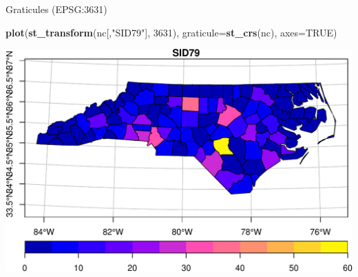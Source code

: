 \documentclass[11pt,ignorenonframetext,]{beamer}
\newenvironment{Shaded}{}{}
\newcommand{\DataTypeTok}[1]{\textcolor[rgb]{0.56,0.13,0.00}{#1}}
\newcommand{\DecValTok}[1]{\textcolor[rgb]{0.25,0.63,0.44}{#1}}
\newcommand{\KeywordTok}[1]{\textcolor[rgb]{0.00,0.44,0.13}{\textbf{#1}}}
\newcommand{\NormalTok}[1]{#1}
\newcommand{\OtherTok}[1]{\textcolor[rgb]{0.00,0.44,0.13}{#1}}
\newcommand{\StringTok}[1]{\textcolor[rgb]{0.25,0.44,0.63}{#1}}
\let\oldShaded\Shaded
\let\endoldShaded\endShaded
\renewenvironment{Shaded}{\footnotesize\begin{spacing}{0.9}\oldShaded}{\endoldShaded\end{spacing}}
\let\oldverbatim\verbatim
\let\endoldverbatim\endverbatim
\newcommand{\scriptoutput}{
  \renewenvironment{Shaded}{\scriptsize\begin{spacing}{0.9}\oldShaded}{\endoldShaded\end{spacing}}
  \renewenvironment{verbatim}{\scriptsize\begin{spacing}{0.9}\oldverbatim}{\endoldverbatim\end{spacing}}
}
\begin{document}
\begin{frame}[fragile,t]{Graticules (EPSG:3631)}
\protect\hypertarget{graticules-epsg3631}{}

\scriptoutput

\begin{Shaded}
\begin{Highlighting}[]
\KeywordTok{plot}\NormalTok{(}\KeywordTok{st_transform}\NormalTok{(nc[,}\StringTok{"SID79"}\NormalTok{], }\DecValTok{3631}\NormalTok{), }\DataTypeTok{graticule=}\KeywordTok{st_crs}\NormalTok{(nc), }\DataTypeTok{axes=}\OtherTok{TRUE}\NormalTok{)}
\end{Highlighting}
\end{Shaded}

\begin{center}\includegraphics[width=\textwidth]{Lec16_files/figure-beamer/unnamed-chunk-5-1} \end{center}

\end{frame}
\end{document}
